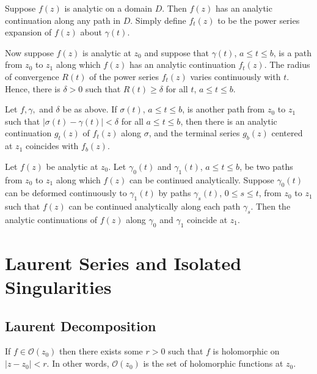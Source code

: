 \documentclass[12pt, a4paper, oneside, openright, titlepage]{book}
\begin{document}
\begin{eg}
    Suppose $f(z)$ is analytic on a domain $D$. Then $f(z)$ has an analytic continuation along any path in $D$. Simply define $f_t(z)$ to be the power series expansion of $f(z)$ about $\gamma(t)$.
\end{eg}

Now suppose $f(z)$ is analytic at $z_0$ and suppose that $\gamma(t)$, $a \leq t \leq b$, is a path from $z_0$ to $z_1$ along which $f(z)$ has an analytic continuation $f_t(z)$. The radius of convergence $R(t)$ of the power series $f_t(z)$ varies continuously with $t$. Hence, there is $\delta > 0$ such that $R(t) \geq \delta$ for all $t$, $a \leq t \leq b$.

\begin{lem}
    Let $f,\gamma,$ and $\delta$ be as above. If $\sigma(t)$, $a \leq t \leq b$, is another path from $z_0$ to $z_1$ such that $|\sigma(t) - \gamma(t)| < \delta$ for all $a \leq t \leq b$, then there is an analytic continuation $g_t(z)$ of $f_t(z)$ along $\sigma$, and the terminal series $g_b(z)$ centered at $z_1$ coincides with $f_b(z)$.
\end{lem}


\begin{namthm}
    Let $f(z)$ be analytic at $z_0$. Let $\gamma_0(t)$ and $\gamma_1(t)$, $a \leq t \leq b$, be two paths from $z_0$ to $z_1$ along which $f(z)$ can be continued analytically. Suppose $\gamma_0(t)$ can be deformed continuously to $\gamma_1(t)$ by paths $\gamma_s(t)$, $0\leq s \leq t$, from $z_0$ to $z_1$ such that $f(z)$ can be continued analytically along each path $\gamma_s$. Then the analytic continuations of $f(z)$ along $\gamma_0$ and $\gamma_1$ coincide at $z_1$.
\end{namthm}






\chapter{Laurent Series and Isolated Singularities}




\section{Laurent Decomposition}

\begin{defn}
    If $f \in \mathcal{O}(z_0)$ then there exists some $r > 0$ such that $f$ is holomorphic on $|z-z_0| < r$. In other words, $\mathcal{O}(z_0)$ is the set of holomorphic functions at $z_0$.
\end{defn}
\end{document}
